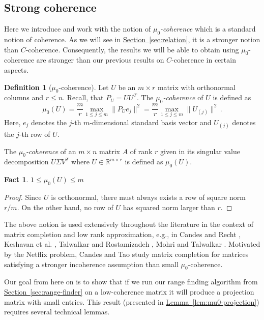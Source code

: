 \documentclass[letterpaper,11pt]{article}
\newtheorem{fact}[theorem]{Fact}
\theoremstyle{definition}
\newtheorem{definition}[theorem]{Definition}
\newcommand{\definitionlabel}[1]{\label{def:#1}}
\newcommand{\lemmaref}[1]{\hyperref[lem:#1]{Lemma~\ref{lem:#1}}}
\newcommand{\sectionref}[1]{\hyperref[sec:#1]{Section~\ref{sec:#1}}}
\newcommand{\mper}{\,.}
\renewcommand{\le}{\leqslant}
\newcommand{\R}{\mathbb{R}}
\begin{document}
\subsection{Strong coherence}

Here we introduce and work with the notion of \emph{$\mu_0$-coherence} which
is a standard notion of coherence. As we will see in \sectionref{relation}, it
is a stronger notion than $C$-coherence. Consequently, the results we will be
able to obtain using $\mu_0$-coherence are stronger than our previous results
on $C$-coherence in certain aspects.

\begin{definition}[$\mu_0$-coherence]
\definitionlabel{mu0}
Let $U$ be an $m\times r$ matrix with orthonormal columns and $r\le n.$
Recall, that $P_U=UU^T.$ The \emph{$\mu_0$-coherence} of $U$ is defined as
\begin{equation}
\mu_0(U)
= \frac mr\max_{1\le j\le m} \|P_Ue_j\|^2
= \frac mr\max_{1\le j\le m} \|U_{(j)}\|^2\mper
\end{equation}
Here, $e_j$ denotes the $j$-th $m$-dimensional standard basis vector and
$U_{(j)}$ denotes the $j$-th row of $U.$

The \emph{$\mu_0$-coherence} of an $m\times n$ matrix $A$ of rank $r$ given in
its singular value decomposition $U\Sigma V^T$ where $U\in\R^{m\times r}$ is
defined as $\mu_0(U).$
\end{definition}

\begin{fact}
$1 \le \mu_0(U)\le m$
\end{fact}
\begin{proof}
Since $U$ is orthonormal, there must always exists a row of square norm $r/m.$
On the other hand, no row of $U$ has squared norm larger than $r.$
\end{proof}

The above notion is used extensively throughout the literature in the context
of matrix completion and low rank approximation, e.g., in Candes and Recht
\cite{CandesR09}, Keshavan et al. \cite{KeshavanMO10}, Talwalkar and
Rostamizadeh \cite{TalwalkarR10}, Mohri and Talwalkar \cite{MohriT10}.
Motivated by the Netflix problem, Candes and Tao \cite{CandesT10} study matrix
completion for matrices satisfying a stronger incoherence assumption than
small $\mu_0$-coherence.

Our goal from here on is to show that if we run our range finding algorithm from
\sectionref{range-finder} on a low-coherence matrix it will produce a
projection matrix with small entries. This result (presented in
\lemmaref{mu0-projection}) requires several technical lemmas.
\end{document}
